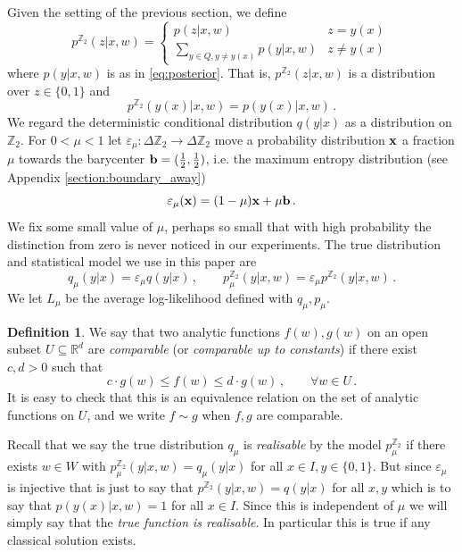 \documentclass[english,letter paper,12pt,reqno]{article}
\theoremstyle{definition}
\newtheorem{definition}[theorem]{Definition}
\newcommand{\lto}{\longrightarrow}
\newcommand{\bb}[1]{\mathbb{#1}}
\begin{document}
Given the setting of the previous section, we define
\[
p^{\bb{Z}_2}( z | x, w ) = \begin{cases} p( z | x, w) & z = y(x)\,\\
\sum_{y \in Q, y \neq y(x)} p(y|x,w) & z \neq y(x)
\end{cases}
\]
where $p(y|x,w)$ is as in \eqref{eq:posterior}. That is, $p^{\bb{Z}_2}(z | x, w)$ is a distribution over $z \in \{0,1\}$ and
\[
p^{\bb{Z}_2}( y(x) | x, w ) = p(y(x) | x, w)\,.
\]
We regard the deterministic conditional distribution $q(y|x)$ as a distribution on $\bb{Z}_2$. For $0 < \mu < 1$ let $\varepsilon_\mu: \Delta \bb{Z}_2 \lto \Delta \bb{Z}_2$ move a probability distribution $\bold{x}$ a fraction $\mu$ towards the barycenter $\bold{b} = (\tfrac{1}{2},\tfrac{1}{2})$, i.e. the maximum entropy distribution (see Appendix \ref{section:boundary_away})
\[
\varepsilon_\mu(\bold{x}) = (1-\mu) \bold{x} + \mu \bold{b}\,.
\]
We fix some small value of $\mu$, perhaps so small that with high probability the distinction from zero is never noticed in our experiments.  The true distribution and statistical model we use in this paper are
\[
q_\mu(y|x) = \varepsilon_\mu q(y|x)\,, \qquad p^{\bb{Z}_2}_\mu(y|x,w) = \varepsilon_\mu p^{\bb{Z}_2}(y|x,w)\,.
\]
We let $L_\mu$ be the average log-likelihood defined with $q_\mu, p_\mu$.

\begin{definition}\label{defn:comparable} We say that two analytic functions $f(w),g(w)$ on an open subset $U \subseteq \mathbb{R}^d$ are \emph{comparable} (or \emph{comparable up to constants}) if there exist $c, d > 0$ such that
\[
c \cdot g(w) \le f(w) \le d \cdot g(w)\,, \qquad \forall w \in U\,.
\]
It is easy to check that this is an equivalence relation on the set of analytic functions on $U$, and we write $f \sim g$ when $f,g$ are comparable.
\end{definition}

Recall that we say the true distribution $q_\mu$ is \emph{realisable} by the model $p^{\bb{Z}_2}_\mu$ if there exists $w \in W$ with $p^{\bb{Z}_2}_\mu(y|x,w) = q_\mu(y|x)$ for all $x \in I, y \in \{0,1\}$. But since $\varepsilon_\mu$ is injective that is just to say that $p^{\bb{Z}_2}(y|x,w) = q(y|x)$ for all $x,y$ which is to say that $p(y(x)|x,w) = 1$ for all $x \in I$. Since this is independent of $\mu$ we will simply say that the \emph{true function is realisable}. In particular this is true if any classical solution exists.
\end{document}
